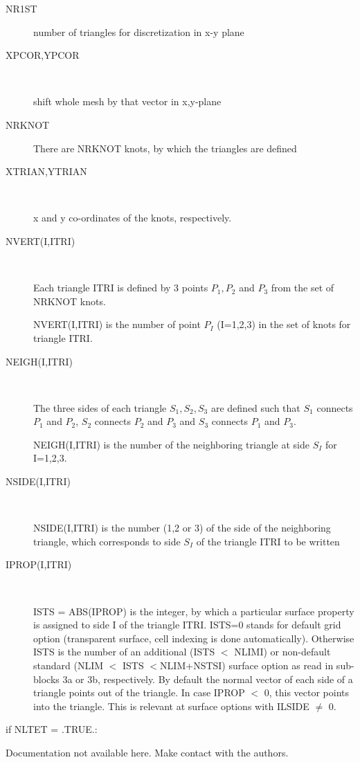 \begin{description}
  \item[NR1ST] number of triangles for discretization in x-y plane
  \item[XPCOR,YPCOR] ~ 

        shift whole mesh by that vector in x,y-plane
  \item[NRKNOT] There are NRKNOT
        knots, by which the triangles are defined
  \item[XTRIAN,YTRIAN] ~

        x and y co-ordinates of the knots, respectively.
  \item[NVERT(I,ITRI)] ~ 

        Each triangle ITRI is defined by 3 points $P_1, P_2$ and $P_3$ from the set of
        NRKNOT knots.

        NVERT(I,ITRI) is the number of point $P_I$ (I=1,2,3) in the set of knots for
        triangle ITRI.
  \item[NEIGH(I,ITRI)] ~ 

        The three sides of each triangle $S_1, S_2, S_3$ are defined such that $S_1$
        connects $P_1$ and $P_2$, $S_2$ connects $P_2$ and $P_3$ and $S_3$ connects
        $P_1$ and $P_3$.

        NEIGH(I,ITRI) is the number of the neighboring triangle at side $S_I$ for
        I=1,2,3.
  \item[NSIDE(I,ITRI)] ~ 

        NSIDE(I,ITRI) is the number (1,2 or 3) of the side of the neighboring triangle,
        which corresponds to side $S_I$ of the triangle ITRI to be written
  \item[IPROP(I,ITRI)] ~ 

        ISTS = ABS(IPROP) is the integer, by which a particular surface property is
        assigned to side I of the triangle ITRI.
        ISTS=0 stands for default grid option (transparent surface, cell indexing is
        done automatically).
        Otherwise ISTS is the number of an additional (ISTS $<$ NLIMI) or non-default
        standard (NLIM $<$ ISTS $<$NLIM+NSTSI) surface option as read in sub-blocks 3a
        or 3b, respectively.
        By default the normal vector of each side of a triangle points out of the
        triangle.
        In case IPROP $<$ 0, this vector points into the triangle.
        This is relevant at surface options with ILSIDE $\not=$ 0.
\end{description}
if NLTET = .TRUE.:

Documentation not available here.
Make contact with the authors.

